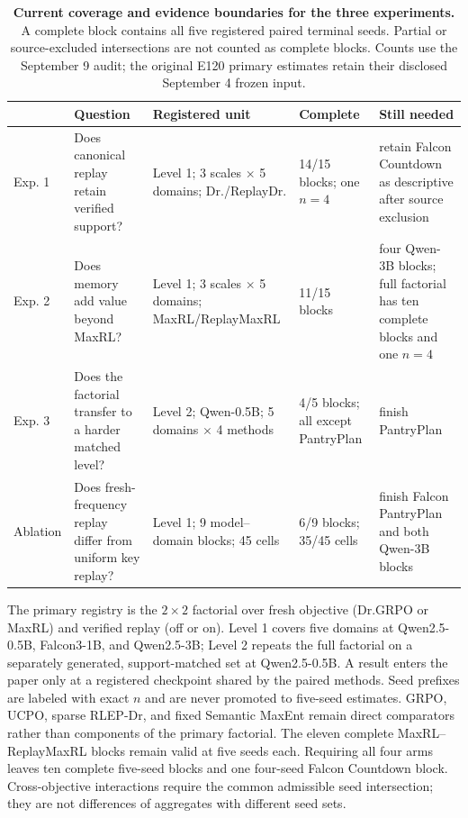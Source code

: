 \documentclass{article}
\newcommand{\1}{\mathbf 1}
\theoremstyle{remark}
\theoremstyle{definition}
\theoremstyle{plain}
\begin{document}
\begin{table}[H]
  \centering
  \caption{\textbf{Current coverage and evidence boundaries for the three
  experiments.} A complete block contains all five registered paired
  terminal seeds. Partial or source-excluded intersections are not counted as complete blocks.
  Counts use the September 9 audit; the original E120 primary estimates
  retain their disclosed September 4 frozen input.}
  \label{tab:experiment-map}
  \scriptsize
  \setlength{\tabcolsep}{3pt}
  \begin{tabularx}{\linewidth}{@{}P{.09\linewidth}P{.27\linewidth}P{.25\linewidth}P{.15\linewidth}Y@{}}
    \toprule
    & \textbf{Question} & \textbf{Registered unit} & \textbf{Complete} &
      \textbf{Still needed} \\
    \midrule
    Exp. 1 & Does canonical replay retain verified support? &
      Level 1; 3 scales $\times$ 5 domains; Dr./ReplayDr. &
      14/15 blocks; one $n=4$ & retain Falcon Countdown as descriptive after source exclusion \\
    Exp. 2 & Does memory add value beyond MaxRL? &
      Level 1; 3 scales $\times$ 5 domains; MaxRL/ReplayMaxRL &
      11/15 blocks & four Qwen-3B blocks; full factorial has ten complete blocks and one $n=4$ \\
    Exp. 3 & Does the factorial transfer to a harder matched level? &
      Level 2; Qwen-0.5B; 5 domains $\times$ 4 methods &
      4/5 blocks; all except PantryPlan & finish PantryPlan \\
    Ablation & Does fresh-frequency replay differ from uniform key replay? &
      Level 1; 9 model--domain blocks; 45 cells &
      6/9 blocks; 35/45 cells & finish Falcon PantryPlan and both Qwen-3B blocks \\
    \bottomrule
  \end{tabularx}
\end{table}


The primary registry is the $2\times2$ factorial over fresh objective
(Dr.GRPO or MaxRL) and verified replay (off or on). Level 1 covers five domains
at Qwen2.5-0.5B, Falcon3-1B, and Qwen2.5-3B; Level 2 repeats the full factorial
on a separately generated, support-matched set at Qwen2.5-0.5B. A result enters
the paper only at a registered checkpoint shared by the paired methods. Seed
prefixes are labeled with exact $n$ and are never promoted to five-seed
estimates. GRPO, UCPO, sparse RLEP-Dr, and fixed Semantic MaxEnt remain direct
comparators rather than components of the primary factorial. The eleven complete
MaxRL--ReplayMaxRL blocks remain valid at five seeds each. Requiring all four
arms leaves ten complete five-seed blocks and one four-seed Falcon Countdown
block. Cross-objective interactions require the common admissible seed
intersection; they are not differences of aggregates with different seed sets.
\end{document}
